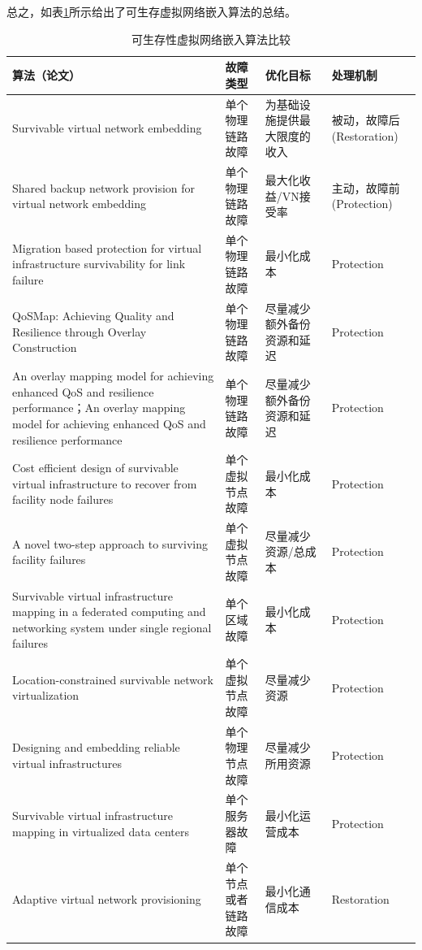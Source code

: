 总之，如表\ref{tab:survivableVirtualNetworkEmbedd}所示给出了可生存虚拟网络嵌入算法的总结。
\begin{table}[htb]
\caption{可生存性虚拟网络嵌入算法比较}\label{tab:survivableVirtualNetworkEmbedd}
\vspace{0.5em}\centering\wuhao
\begin{tabularx}{48em}{|*{4}{>{\centering\arraybackslash}X|}}
\toprule[1.5pt]
算法（论文）   & 故障类型  & 优化目标 & 处理机制  \\
\midrule[1pt]
Survivable virtual network embedding\cite{rahman2013svne} & 单个物理链路故障 & 为基础设施提供最大限度的收入 & 被动，故障后(Restoration)\\
\hline
Shared backup network provision for virtual network embedding\cite{guo2011shared} & 单个物理链路故障 & 最大化收益/VN接受率& 主动，故障前(Protection)\\
\hline
Migration based protection for virtual infrastructure survivability for link failure\cite{yu2011migration} & 单个物理链路故障 & 最小化成本 & Protection\\
\hline
QoSMap: Achieving Quality and Resilience through Overlay Construction\cite{shamsi2009qosmap} & 单个物理链路故障 & 尽量减少额外备份资源和延迟 & Protection\\
\hline
An overlay mapping model for achieving enhanced QoS and resilience performance\cite{zhang2011overlay}；An overlay mapping model for achieving enhanced QoS and resilience performance\cite{zhang2011overlay} & 单个物理链路故障 & 尽量减少额外备份资源和延迟 & Protection\\
\hline
Cost efficient design of survivable virtual infrastructure to recover from facility node failures\cite{yu2011cost} & 单个虚拟节点故障& 最小化成本 & Protection\\
\hline
A novel two-step approach to surviving facility failures\cite{qiao2011novel} & 单个虚拟节点故障 & 尽量减少资源/总成本 & Protection\\
\hline
Survivable virtual infrastructure mapping in a federated computing and networking system under single regional failures\cite{yu2010survivable} & 单个区域故障 & 最小化成本 & Protection \\
\hline
Location-constrained survivable network virtualization\cite{hu2012location} & 单个虚拟节点故障 & 尽量减少资源 & Protection\\
\hline
Designing and embedding reliable virtual infrastructures\cite{yeow2010designing} & 单个物理节点故障 & 尽量减少所用资源 & Protection\\
\hline
Survivable virtual infrastructure mapping in virtualized data centers\cite{xu2012survivable} & 单个服务器故障 & 最小化运营成本& Protection\\
\hline
Adaptive virtual network provisioning\cite{houidi2010adaptive} & 单个节点或者链路故障 & 最小化通信成本 & Restoration\\
\bottomrule[1.5pt]
\end{tabularx}
\vspace{\baselineskip}
\end{table}

